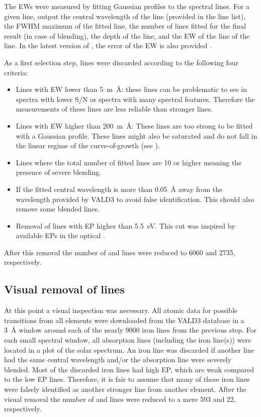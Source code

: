 The EWs were measured by fitting Gaussian profiles to the spectral lines. For a given line,
 output the central wavelength of the line (provided in the line list), the FWHM maximum
of the fitted line, the number of lines fitted for the final result (in case of blending), the depth
of the line, and the EW of the line of the line. In the latest version of , the error of
the EW is also provided \citep{Sousa2015a}.

As a first selection step, lines were discarded according to the following four criteria:

\begin{itemize}
  \item Lines with EW lower than \SI{5}{m\angstrom}: these lines can be problematic to see in
        spectra with lower S/N or spectra with many spectral features. Therefore the measurements
        of these lines are less reliable than stronger lines.
  \item Lines with EW higher than \SI{200}{m\angstrom}: These lines are too strong to be fitted
        with a Gaussian profile. These lines might also be saturated and do not fall in the linear
        regime of the curve-of-growth (see ).
  \item Lines where the total number of fitted lines are 10 or higher meaning the presence of
        severe blending.
  \item If the fitted central wavelength is more than \SI{0.05}{\angstrom} away from the wavelength
        provided by VALD3 to avoid false identification. This should also remove some blended lines.
  \item Removal of lines with EP higher than \SI{5.5}{eV}. This cut was inspired by available EPs in
        the optical \citep[see e.g.][]{Sousa2008a}.
\end{itemize}
After this removal the number of  and  lines were reduced to \num{6060} and
\num{2735}, respectively.


\subsection{Visual removal of lines}
\label{sec:visual}

At this point a visual inspection was necessary. All atomic data for possible transitions from all
elements were downloaded from the VALD3 database in a \SI{3}{\angstrom} window around each of the
nearly \num{9000} iron lines from the previous step. For each small spectral window, all absorption
lines (including the iron line(s)) were located in a plot of the solar spectrum. An iron line was
discarded if another line had the same central wavelength and/or the absorption line were severely
blended. Most of the discarded iron lines had high EP, which are weak compared to the low EP lines.
Therefore, it is fair to assume that many of these iron lines were falsely identified as another
stronger line from another element. After the visual removal the number of  and
 lines were reduced to a mere 593 and 22, respectively.

